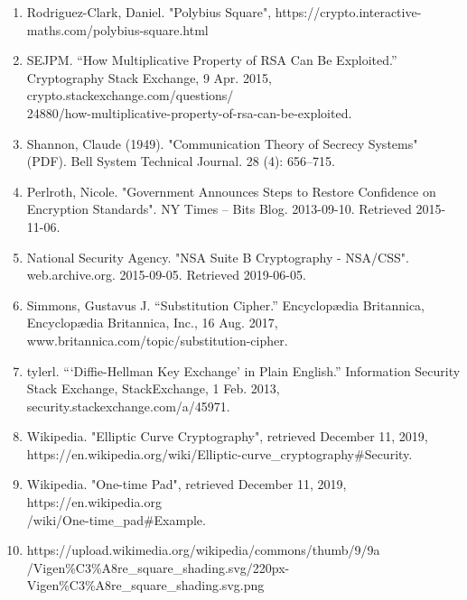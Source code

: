 \documentclass[12pt]{article}
\begin{document}
\begin{enumerate}
    \item \label{rod} Rodriguez-Clark, Daniel. "Polybius Square", https://crypto.interactive-maths.com/polybius-square.html
    \item \label{multi} SEJPM. “How Multiplicative Property of RSA Can Be Exploited.” Cryptography Stack Exchange, 9 Apr. 2015, crypto.stackexchange.com/questions/\\24880/how-multiplicative-property-of-rsa-can-be-exploited.
    \item \label{shannon} Shannon, Claude (1949). "Communication Theory of Secrecy Systems" (PDF). Bell System Technical Journal. 28 (4): 656–715. 
    \item \label{nicole} Perlroth, Nicole. "Government Announces Steps to Restore Confidence on Encryption Standards". NY Times – Bits Blog. 2013-09-10. Retrieved 2015-11-06.
    \item \label{nsa} National Security Agency. "NSA Suite B Cryptography - NSA/CSS". web.archive.org. 2015-09-05. Retrieved 2019-06-05.
    \item \label{simmons} Simmons, Gustavus J. “Substitution Cipher.” Encyclopædia 
    \indent Britannica, Encyclopædia Britannica, Inc., 16 Aug. 2017, www.britannica.com/topic/substitution-cipher.
    \item \label{tyler} tylerl. “‘Diffie-Hellman Key Exchange’ in Plain English.” Information Security Stack Exchange, StackExchange, 1 Feb. 2013, security.stackexchange.com/a/45971.
    \item \label{wiki} Wikipedia. "Elliptic Curve Cryptography", retrieved December 11, 2019, https://en.wikipedia.org/wiki/Elliptic-curve\_cryptography\#Security.
    \item \label{wiki2} Wikipedia. "One-time Pad", retrieved December 11, 2019, https://en.wikipedia.org\\/wiki/One-time\_pad\#Example.
    \item \label{table} https://upload.wikimedia.org/wikipedia/commons/thumb/9/9a\\/Vigen\%C3\%A8re\_square\_shading.svg/220px-Vigen\%C3\%A8re\_square\_shading.svg.png
\end{enumerate}
\end{document}
